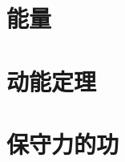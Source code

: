 \documentclass[color=purple,openany]{textbook-cn}
\begin{document}
\begin{Link}
\zhlipsum[1]
\end{Link}





\section{能量}

\begin{Point}
\lipsum[2]
\end{Point}

\begin{Case}
\item \lipsum[1][3]
\item \lipsum[1][3]
\item \lipsum[1][3]
\item \lipsum[1][3]
\end{Case}

\begin{Link}
\zhlipsum[1]
\end{Link}





\section{动能定理}


\begin{Point}
\lipsum[2]
\end{Point}

\begin{Case}
\item \lipsum[1][3]
\item \lipsum[1][3]
\item \lipsum[1][3]
\item \lipsum[1][3]
\end{Case}

\begin{Link}
\zhlipsum[1]
\end{Link}



\section{保守力的功}


\begin{Point}
\lipsum[2]
\end{Point}

\begin{Case}
\item \lipsum[1][3]
\item \lipsum[1][3]
\item \lipsum[1][3]
\item \lipsum[1][3]
\end{Case}
\end{document}
